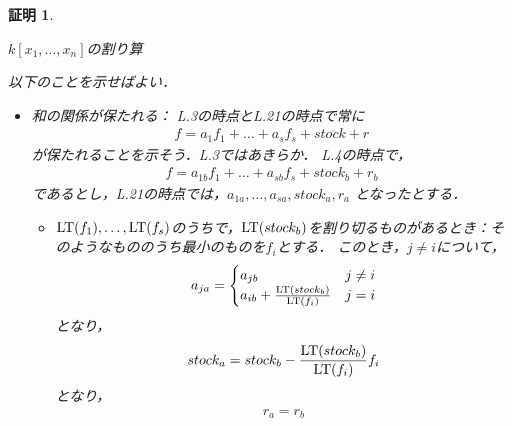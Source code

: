 \documentclass[9pt]{ltjsarticle}
\theoremstyle{break}
\theoremstyle{break}
\theoremstyle{break}
\theoremstyle{break}
\theoremstyle{break}
\theoremstyle{break}
\theoremstyle{break}
\theoremstyle{break}
\theoremstyle{break}
\theoremstyle{break}
\theoremstyle{break}
\theoremstyle{break}
\theoremstyle{break}
\theoremstyle{break}
\theoremstyle{break}
\theoremstyle{nonumberbreak}
\newtheorem{myproof}{証明}
\theoremstyle{nonumberbreak}
\begin{document}
\begin{myproof}
 \begin{algorithm}[H]
\caption{$k[x_1,\dots,x_n]$の割り算}
  \begin{algorithmic}[1]
   \ENDIF{}
   \ENDWHILE{}
   \ENDIF{}
   \ENDWHILE{}
  \end{algorithmic}
 \end{algorithm}
以下のことを示せばよい．
 \begin{itemize}
  \item 和の関係が保たれる：
L.3の時点とL.21の時点で常に
\begin{align}
 f = a_1 f_1 + \dots + a_s f_s + stock + r
\end{align}
が保たれることを示そう．L.3ではあきらか．
L.4の時点で，
\begin{align}
 f = a_{1b} f_1 + \dots + a_{sb} f_s + stock_b + r_b
\end{align}
であるとし，L.21の時点では，$a_{1a},\dots,a_{sa},stock_{a},r_a$
となったとする．
\begin{itemize}
 \item ${\rm LT}(f_1),\dots,{\rm LT}(f_s)$のうちで，${\rm LT}(stock_b)$を割り切るものがあるとき：そのようなもののうち最小のものを$f_i$とする．
このとき，$j\neq i$について，
\begin{align}
 a_{ja} =
\begin{cases}
 a_{jb} & j\neq i\\
 a_{ib} + \frac{{\rm LT}(stock_b)}{{\rm LT}(f_i)} &  j= i
\end{cases}
\end{align}
となり，
\begin{align}
 stock_a = stock_b - \frac{{\rm LT}(stock_b)}{{\rm LT}(f_i)}f_i
\end{align}
となり，
\begin{align}
 r_a = r_b
\end{align}

\end{itemize}
\end{itemize}
\end{myproof}
\end{document}
